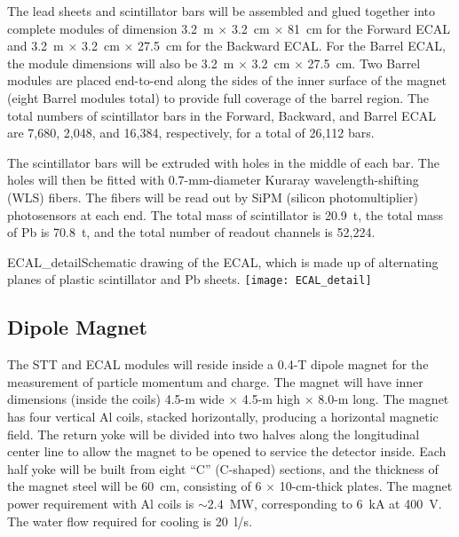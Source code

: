 The lead sheets and scintillator bars will be assembled and glued together
into complete modules of dimension 
3.2~m $\times$ 3.2~cm $\times$ 81~cm for the Forward ECAL and
3.2~m $\times$ 3.2~cm $\times$ 27.5~cm for the Backward ECAL. For the Barrel ECAL, the module 
dimensions will also be 
3.2~m $\times$ 3.2~cm $\times$ 27.5~cm. Two Barrel modules are placed end-to-end 
along the sides of the inner surface of the magnet (eight Barrel modules
total) to provide full coverage of the barrel region.
The total numbers of scintillator bars in the
Forward, Backward, and Barrel ECAL are 7,680, 2,048, and 16,384, respectively, 
for a total of 26,112 bars. 

The scintillator bars will be extruded with 
holes in the middle of each bar. The
holes will then be fitted with 0.7-mm-diameter Kuraray wavelength-shifting (WLS) fibers.
The fibers will be read out by SiPM (silicon photomultiplier) photosensors at each end.
The total mass of scintillator is 20.9~t, 
the total mass of Pb is 70.8~t, and
the total number of readout channels is 52,224. 

\begin{cdrfigure}{ECAL_detail}{Schematic drawing of the ECAL, which is made up of alternating planes
of plastic scintillator and Pb sheets.}
\texttt{[image: ECAL\_detail]}
\end{cdrfigure}


\subsection{Dipole Magnet}
\label{cdrsec:detectors-nd-ref-fgt-magnet}

The STT and ECAL modules will reside inside a 0.4-T dipole 
magnet for the measurement of particle momentum and charge. 
The magnet will have inner dimensions (inside the coils) 
4.5-m wide $\times$ 4.5-m high $\times$ 8.0-m long. The 
magnet has four vertical Al coils, stacked horizontally, producing a horizontal magnetic 
field. The return yoke will be divided into two halves along the 
longitudinal center line to allow the magnet to be opened to service the
detector inside. %
Each half yoke will be built
from eight ``C'' (C-shaped) sections, and the thickness of the 
magnet steel will be 60~cm, consisting of 6
$\times$ 10-cm-thick plates. The magnet power requirement with Al coils is $\sim 2.4$~MW,
corresponding to 6~kA at 400~V. The water flow required for cooling is 20~l/s.


